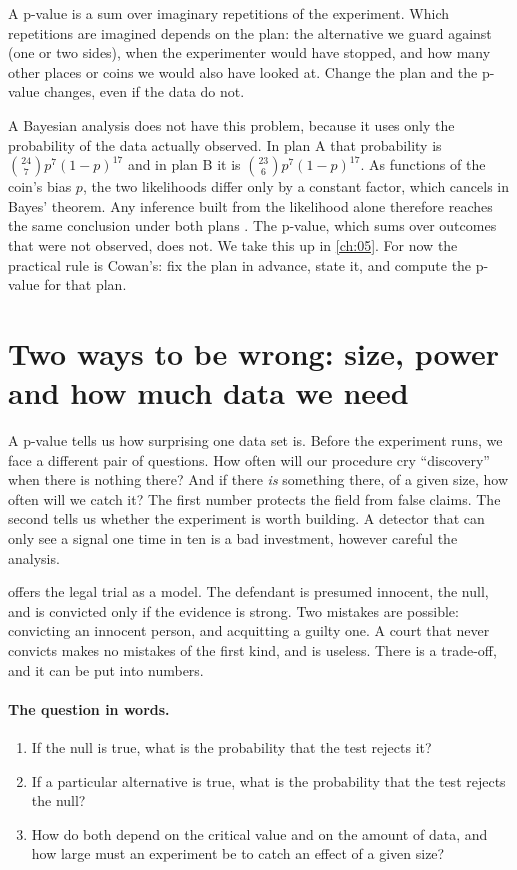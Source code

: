 \begin{keyidea}
A p-value is a sum over imaginary repetitions of the experiment. Which
repetitions are imagined depends on the plan: the alternative we guard against
(one or two sides), when the experimenter would have stopped, and how many
other places or coins we would also have looked at. Change the plan and the
p-value changes, even if the data do not.
\end{keyidea}

A Bayesian analysis does not have this problem, because it uses only the
probability of the data actually observed. In plan A that probability is
$\binom{24}{7}p^7(1-p)^{17}$ and in plan B it is $\binom{23}{6}p^7(1-p)^{17}$.
As functions of the coin's bias $p$, the two likelihoods differ only by a
constant factor, which cancels in Bayes' theorem. Any inference built from the
likelihood alone therefore reaches the same conclusion under both plans
. The p-value, which sums over outcomes that were
not observed, does not. We take this up in \cref{ch:05}. For now the practical
rule is Cowan's: fix the plan in advance, state it, and compute the p-value for
that plan.
\section{Two ways to be wrong: size, power and how much data we need}
\label{4a:sec:power}

A p-value tells us how surprising one data set is. Before the experiment runs,
we face a different pair of questions. How often will our procedure cry
``discovery'' when there is nothing there? And if there \emph{is} something
there, of a given size, how often will we catch it? The first number protects
the field from false claims. The second tells us whether the experiment is
worth building. A detector that can only see a signal one time in ten is a
bad investment, however careful the analysis.

 offers the legal trial as a model. The defendant is presumed
innocent, the null, and is convicted only if the evidence is strong. Two
mistakes are possible: convicting an innocent person, and acquitting a guilty
one. A court that never convicts makes no mistakes of the first kind, and is
useless. There is a trade-off, and it can be put into numbers.

\paragraph{The question in words.}
\begin{enumerate}[label=\arabic*.]
  \item If the null is true, what is the probability that the test rejects it?
  \item If a particular alternative is true, what is the probability that the
        test rejects the null?
  \item How do both depend on the critical value and on the amount of data,
        and how large must an experiment be to catch an effect of a given size?
\end{enumerate}

